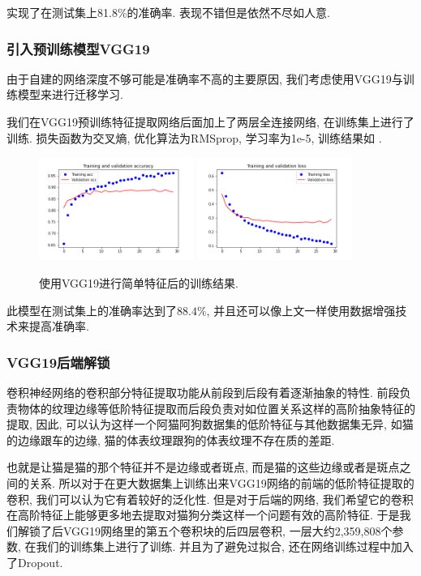 \documentclass[lang=cn,11pt]{elegantpaper}
\begin{document}
实现了在测试集上81.8\%的准确率. 表现不错但是依然不尽如人意.

\subsubsection{引入预训练模型VGG19}
由于自建的网络深度不够可能是准确率不高的主要原因, 我们考虑使用VGG19与训练模型来进行迁移学习. 

我们在VGG19预训练特征提取网络后面加上了两层全连接网络, 在训练集上进行了训练. 损失函数为交叉熵, 优化算法为RMSprop, 学习率为1e-5, 训练结果如 .
\begin{figure}[htbp]
	\centering
	  \includegraphics[width=0.45\textwidth]{VGG_classify_1}
	  \includegraphics[width=0.45\textwidth]{VGG_classify_2}
	  \caption{使用VGG19进行简单特征后的训练结果. \label{fig:ab1}}
	\end{figure}

此模型在测试集上的准确率达到了$88.4\%$, 并且还可以像上文一样使用数据增强技术来提高准确率. 
\subsubsection{VGG19后端解锁}

卷积神经网络的卷积部分特征提取功能从前段到后段有着逐渐抽象的特性. 前段负责物体的纹理边缘等低阶特征提取而后段负责对如位置关系这样的高阶抽象特征的提取, 因此, 可以认为这样一个阿猫阿狗数据集的低阶特征与其他数据集无异, 如猫的边缘跟车的边缘, 猫的体表纹理跟狗的体表纹理不存在质的差距. 

也就是让猫是猫的那个特征并不是边缘或者斑点, 而是猫的这些边缘或者是斑点之间的关系. 所以对于在更大数据集上训练出来VGG19网络的前端的低阶特征提取的卷积, 我们可以认为它有着较好的泛化性. 但是对于后端的网络, 我们希望它的卷积在高阶特征上能够更多地去提取对猫狗分类这样一个问题有效的高阶特征. 于是我们解锁了后VGG19网络里的第五个卷积块的后四层卷积, 一层大约2,359,808个参数, 在我们的训练集上进行了训练. 并且为了避免过拟合, 还在网络训练过程中加入了Dropout.
\end{document}
